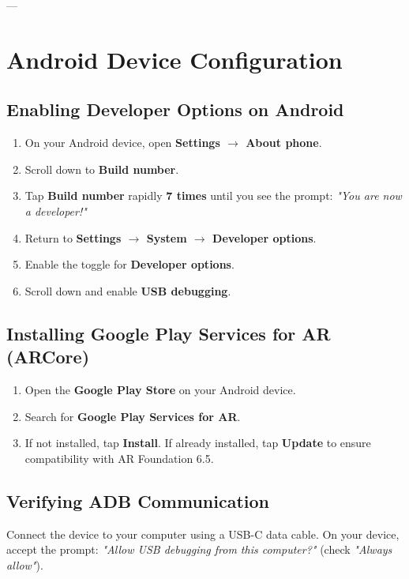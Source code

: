 \documentclass[11pt,a4paper]{article}
\begin{document}
---

\section{Android Device Configuration}

\subsection{Enabling Developer Options on Android}
\begin{enumerate}
    \item On your Android device, open \textbf{Settings $\rightarrow$ About phone}.
    \item Scroll down to \textbf{Build number}.
    \item Tap \textbf{Build number} rapidly \textbf{7 times} until you see the prompt: \textit{"You are now a developer!"}
    \item Return to \textbf{Settings $\rightarrow$ System $\rightarrow$ Developer options}.
    \item Enable the toggle for \textbf{Developer options}.
    \item Scroll down and enable \textbf{USB debugging}.
\end{enumerate}

\subsection{Installing Google Play Services for AR (ARCore)}
\begin{enumerate}
    \item Open the \textbf{Google Play Store} on your Android device.
    \item Search for \textbf{Google Play Services for AR}.
    \item If not installed, tap \textbf{Install}. If already installed, tap \textbf{Update} to ensure compatibility with AR Foundation 6.5.
\end{enumerate}

\subsection{Verifying ADB Communication}
Connect the device to your computer using a USB-C data cable. On your device, accept the prompt: \textit{"Allow USB debugging from this computer?"} (check \textit{"Always allow"}).
\end{document}
